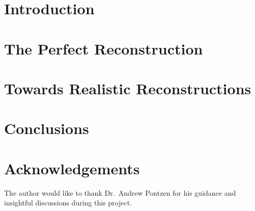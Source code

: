 \documentclass[12pt,aas_macros,twoside]{report}
\begin{document}
\tableofcontents

\newpage
\chapter{Introduction}


% 

% 

\newpage
\chapter{The Perfect Reconstruction}


\newpage
\chapter{Towards Realistic Reconstructions}


\newpage
\chapter{Conclusions}


\chapter*{Acknowledgements}
The author would like to thank Dr.~Andrew Pontzen for his guidance and insightful discussions during this project.

\printbibliography{}
\end{document}
